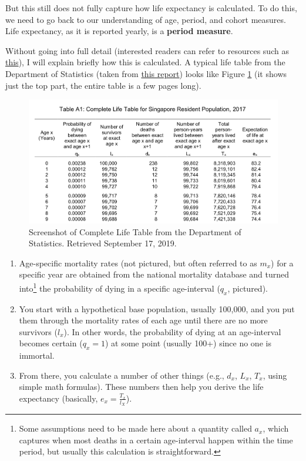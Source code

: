\documentclass[openany]{book}
\let\rmarkdownfootnote\footnote%
\def\footnote{\protect\rmarkdownfootnote}
\begin{document}
But this still does not fully capture how life expectancy is calculated.
To do this, we need to go back to our understanding of age, period, and
cohort measures. Life expectancy, as it is reported yearly, is a
\textbf{period measure}.

Without going into full detail (interested readers can refer to
resources such as
\href{https://www.measureevaluation.org/resources/training/online-courses-and-resources/non-certificate-courses-and-mini-tutorials/multiple-decrement-life-tables/lesson-3}{this}),
I will explain briefly how this is calculated. A typical life table from
the Department of Statistics (taken from
\href{https://www.singstat.gov.sg/-/media/files/publications/population/lifetable17-18.pdf}{this
report}) looks like Figure \ref{fig:apc-lifetable} (it shows just the
top part, the entire table is a few pages long).

\begin{figure}

{\centering \includegraphics[width=0.8\linewidth]{images/apc/apc_lifetable} 

}

\caption{Screenshot of Complete Life Table from the Department of Statistics. Retrieved September 17, 2019.}\label{fig:apc-lifetable}
\end{figure}

\begin{enumerate}
\def\labelenumi{\arabic{enumi}.}
\item
  Age-specific mortality rates (not pictured, but often referred to as
  \(m_x\)) for a specific year are obtained from the national mortality
  database and turned into\footnote{Some assumptions need to be made
    here about a quantity called \(a_x\), which captures when most
    deaths in a certain age-interval happen within the time period, but
    usually this calculation is straightforward.} the probability of
  dying in a specific age-interval (\(q_x\), pictured).
\item
  You start with a hypothetical base population, usually 100,000, and
  you put them through the mortality rates of each age until there are
  no more survivors (\(l_x\)). In other words, the probability of dying
  at an age-interval becomes certain (\(q_x = 1\)) at some point
  (usually 100+) since no one is immortal.
\item
  From there, you calculate a number of other things (e.g., \(d_x\),
  \(L_x\), \(T_x\), using simple math formulas). These numbers then help
  you derive the life expectancy (basically, \(e_x = \frac{T_x}{l_X}\)).
\end{enumerate}
\end{document}
